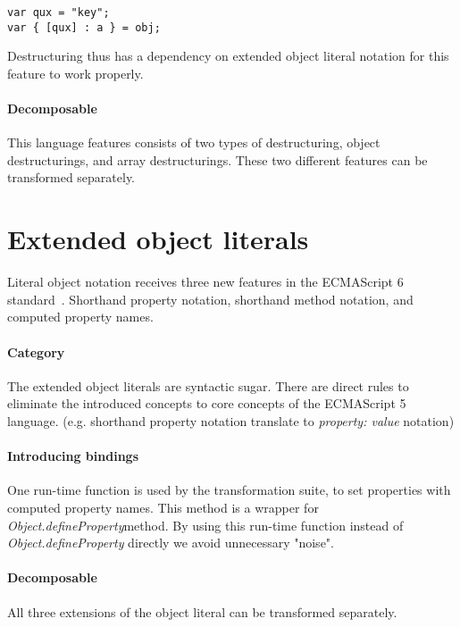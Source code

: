 \begin{lstlisting}
var qux = "key";
var { [qux] : a } = obj;
\end{lstlisting}

Destructuring thus has a dependency on extended object literal notation for this feature to work properly.

\paragraph{Decomposable}
This language features consists of two types of destructuring, object destructurings, and array destructurings. These two different features can be transformed separately.

\section{Extended object literals} \label{object-literals}
Literal object notation receives three new features in the ECMAScript 6 standard~\cite[12.2.5]{SpecJS}. Shorthand property notation, shorthand method notation, and computed property names.

\paragraph{Category}
The extended object literals are syntactic sugar. There are direct rules to eliminate the introduced concepts to core concepts of the ECMAScript 5 language. (e.g. shorthand property notation translate to \textit{property: value} notation)

\paragraph{Introducing bindings}
One run-time function is used by the transformation suite, to set properties with computed property names. This method is a wrapper for \textit{Object.defineProperty}\footnotemark method. By using this run-time function instead of \textit{Object.defineProperty} directly we avoid unnecessary "noise".

\paragraph{Decomposable}
All three extensions of the object literal can be transformed separately.

